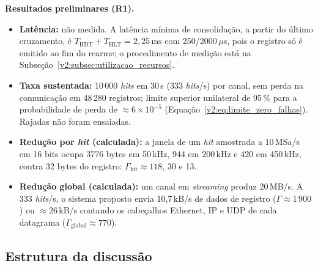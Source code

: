 \textbf{Resultados preliminares (R1).}
\begin{itemize}
	\item \textbf{Latência:} não medida. A latência mínima de consolidação, a partir do último cruzamento, é \(T_{\mathrm{HDT}} + T_{\mathrm{HLT}} = 2{,}25\,\mathrm{ms}\) com 250/2000\,\(\mu\)s, pois o registro só é emitido ao fim do rearme; o procedimento de medição está na Subseção~\ref{v2:subsec:utilizacao_recursos}.
	\item \textbf{Taxa sustentada:} 10\,000 \textit{hits} em 30\,s (333 \textit{hits}/s) por canal, sem perda na comunicação em 48\,280 registros; limite superior unilateral de 95\,\% para a probabilidade de perda de \(\approx 6\times10^{-5}\) (Equação~\eqref{v2:eq:limite_zero_falhas}). Rajadas não foram ensaiadas.
	\item \textbf{Redução por \textit{hit} (calculada):} a janela de um \textit{hit} amostrada a 10\,MSa/s em 16 bits ocupa 3776 bytes em 50\,kHz, 944 em 200\,kHz e 420 em 450\,kHz, contra 32 bytes do registro: \(\Gamma_{\mathrm{hit}} \approx 118\), 30 e 13.
	\item \textbf{Redução global (calculada):} um canal em \textit{streaming} produz 20\,MB/s. A 333 \textit{hits}/s, o sistema proposto envia 10,7\,kB/s de dados de registro (\(\Gamma \approx 1\,900\)) ou \(\approx 26\,\mathrm{kB/s}\) contando os cabeçalhos Ethernet, IP e UDP de cada datagrama (\(\Gamma_{\mathrm{global}} \approx 770\)).
\end{itemize}


\subsection{Estrutura da discussão}
\label{v2:subsec:discussao_resultados}

